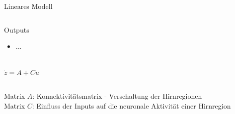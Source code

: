 \documentclass{beamer}
\begin{document}
\begin{frame}{Lineares Modell}
\begin{columns}
\begin{center}
{\begin{minipage}{\textwidth}
\begin{block}{Outputs}
\begin{itemize}
						\item ...
						\end{itemize}
					\end{block}
					\end{minipage}
				}\\
				\vspace{0.5cm}
				$\dot{z}=A+Cu$ 
			\end{center}
		\end{columns}	
		\vspace{0.5cm}
		\begin{small}
		Matrix $A$: Konnektivitätsmatrix - Verschaltung der Hirnregionen \\
		Matrix $C$: Einfluss der Inputs auf die neuronale Aktivität einer Hirnregion
	\end{small}		 
	\end{frame}
	
\end{document}

